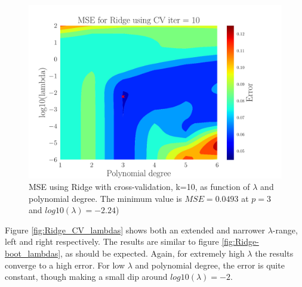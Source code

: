 \documentclass[reprint,english,notitlepage,aps,nobalancelastpage,nofootinbib]{revtex4-1}  %
\begin{document}
\begin{figure}[H]
	\begin{center}
		\includegraphics[width=0.8\linewidth]{Contour_PL_Ridge_CV10_n30_eps0.2_p1_6_lmb2_m6.pdf}
	\end{center}
	\caption{MSE using Ridge with cross-validation, k=10, as function of $\lambda$ and polynomial degree. The minimum value is $MSE=0.0493$ at $p=3$ and $log10(\lambda)=-2.24$)}
	\label{fig:Ridge_CV_heatmap}
\end{figure}

Figure \ref{fig:Ridge_CV_lambdas} shows both an extended and narrower $\lambda$-range, left and right respectively. The results are similar to figure \ref{fig:Ridge-boot_lambdas}, as should be expected. Again, for extremely high $\lambda$ the results converge to a high error. For low $\lambda$ and polynomial degree, the error is quite constant, though making a small dip around $log10(\lambda)=-2$.
\end{document}
